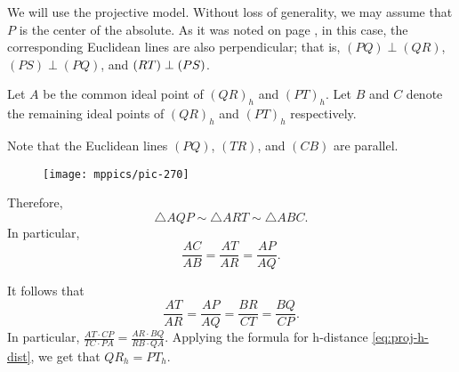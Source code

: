 We will use the projective model.
Without loss of generality, we may assume that $P$ is the center of the absolute.
As it was noted on page \pageref{klein-angles},
in this case, the corresponding Euclidean lines are also perpendicular;
that is, $(PQ)\perp (QR)$, $(PS)\perp(PQ)$, and $(RT)\z\perp (PS)$.

Let $A$ be the common ideal point of $(QR)_h$ and $(PT)_h$.
Let $B$ and $C$ denote the remaining ideal points of $(QR)_h$ and $(PT)_h$ respectively.

Note that the Euclidean lines $(PQ)$, $(TR)$, and $(CB)$ are parallel.

\begin{wrapfigure}{o}{55mm}
\vskip-2mm
\centering
\texttt{[image: mppics/pic-270]}
\vskip2mm
\end{wrapfigure}

Therefore, 
\[\triangle AQP\sim \triangle ART \sim\triangle ABC.\]
In particular,
\[\frac{AC}{AB}=\frac{AT}{AR}=\frac{AP}{AQ}.\]

It follows that
\[\frac{AT}{AR}=\frac{AP}{AQ}=\frac{BR}{CT}=\frac{BQ}{CP}.\]
In particular, $\tfrac{AT\cdot CP}{TC\cdot PA}=\tfrac{AR\cdot BQ}{RB\cdot QA}$.
Applying the formula for h-distance \ref{eq:proj-h-dist}, we get that $QR_h=PT_h$.
\qeds
 

